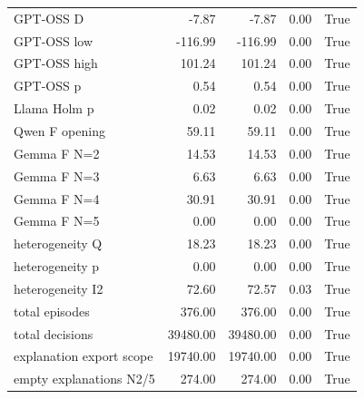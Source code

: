 \begin{longtable}{lrrrr}
GPT-OSS D & -7.87 & -7.87 & 0.00 & True \\
GPT-OSS low & -116.99 & -116.99 & 0.00 & True \\
GPT-OSS high & 101.24 & 101.24 & 0.00 & True \\
GPT-OSS p & 0.54 & 0.54 & 0.00 & True \\
Llama Holm p & 0.02 & 0.02 & 0.00 & True \\
Qwen F opening & 59.11 & 59.11 & 0.00 & True \\
Gemma F N=2 & 14.53 & 14.53 & 0.00 & True \\
Gemma F N=3 & 6.63 & 6.63 & 0.00 & True \\
Gemma F N=4 & 30.91 & 30.91 & 0.00 & True \\
Gemma F N=5 & 0.00 & 0.00 & 0.00 & True \\
heterogeneity Q & 18.23 & 18.23 & 0.00 & True \\
heterogeneity p & 0.00 & 0.00 & 0.00 & True \\
heterogeneity I2 & 72.60 & 72.57 & 0.03 & True \\
total episodes & 376.00 & 376.00 & 0.00 & True \\
total decisions & 39480.00 & 39480.00 & 0.00 & True \\
explanation export scope & 19740.00 & 19740.00 & 0.00 & True \\
empty explanations N2/5 & 274.00 & 274.00 & 0.00 & True \\
\end{longtable}
